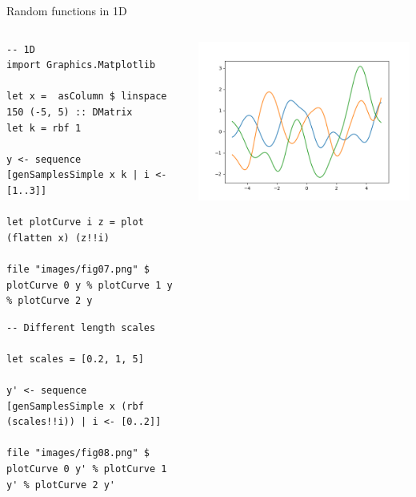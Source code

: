 \documentclass[presentation]{beamer}
\begin{document}
\begin{frame}[fragile,label={sec:org3d3c0f4}]{Random functions in 1D}
 \begin{columns}
\begin{column}{0.55\columnwidth}
\begin{verbatim}
-- 1D
import Graphics.Matplotlib

let x =  asColumn $ linspace 150 (-5, 5) :: DMatrix
let k = rbf 1

y <- sequence [genSamplesSimple x k | i <- [1..3]]

let plotCurve i z = plot (flatten x) (z!!i)

file "images/fig07.png" $ plotCurve 0 y % plotCurve 1 y % plotCurve 2 y
\end{verbatim}

\begin{verbatim}
-- Different length scales

let scales = [0.2, 1, 5]

y' <- sequence [genSamplesSimple x (rbf (scales!!i)) | i <- [0..2]]

file "images/fig08.png" $ plotCurve 0 y' % plotCurve 1 y' % plotCurve 2 y'
\end{verbatim}
\end{column}

\begin{column}{0.4\columnwidth}
\begin{center}
\includegraphics[width=.9\linewidth]{images/fig07.png}
\end{center}


\end{column}
\end{columns}
\end{frame}
\end{document}
